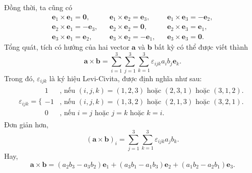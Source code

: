 Đồng thời, ta cũng có 
\begin{align*}
\mathbf{e}_1 \times \mathbf{e}_1 = \mathbf{0},    && \mathbf{e}_1 \times \mathbf{e}_2 = \mathbf{e}_3,  && \mathbf{e}_1 \times \mathbf{e}_3 = -\mathbf{e}_2, \\
\mathbf{e}_2 \times \mathbf{e}_1 = -\mathbf{e}_3, && \mathbf{e}_2 \times \mathbf{e}_2 = \mathbf{0},    && \mathbf{e}_2 \times \mathbf{e}_3 = \mathbf{e}_1, \\
\mathbf{e}_3 \times \mathbf{e}_1 = \mathbf{e}_2,  && \mathbf{e}_3 \times \mathbf{e}_2 = -\mathbf{e}_1, && \mathbf{e}_3 \times \mathbf{e}_3 = \mathbf{0}.
\end{align*}
Tổng quát, tích có hướng của hai vector \(\mathbf{a}\) và \(\mathbf{b}\) bất kỳ có thể được viết thành
\begin{equation}
    \mathbf{a} \times \mathbf{b} = \sum_{i=1}^{3}\sum_{j=1}^{3}\sum_{k=1}^{3}\varepsilon_{ijk} a_i b_j  \mathbf{e}_k.
\end{equation}
Trong đó, \(\varepsilon_{ijk}\) là ký hiệu Levi-Civita, được định nghĩa như sau:
\begin{equation*}
\begin{array}{l}
        \varepsilon_{ijk}=\Bigg\{
        \begin{array}{ll}
        1  & \text{, nếu } (i,j,k)=(1,2,3) \text{ hoặc } (2,3,1) \text{ hoặc } (3,1,2).\\
        -1 & \text{, nếu } (i,j,k)=(1,3,2) \text{ hoặc } (2,1,3) \text{ hoặc } (3,2,1).\\
        0  & \text{, nếu } i=j \text{ hoặc } j=k \text{ hoặc } k=i.
        \end{array}
\end{array}
\end{equation*}  Đơn giản hơn, \[(\mathbf{a}\times\mathbf{b})_i = \sum_{j=1}^{3}\sum_{k=1}^{3}\varepsilon_{ijk}a_j b_k.\] Hay, 
\begin{equation}
    \mathbf{a}\times\mathbf{b}=(a_2 b_3 - a_3 b_2)\mathbf{e}_1 + (a_3 b_1 - a_1 b_3)\mathbf{e}_2 + (a_1 b_2 - a_2 b_1)\mathbf{e}_3.
\end{equation}

